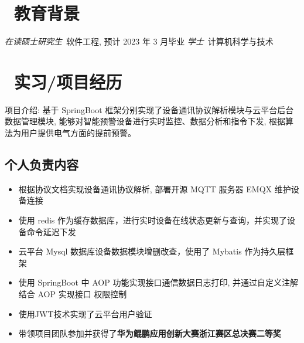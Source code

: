 \documentclass{resume}
\begin{document}


 
\section{\faGraduationCap\  教育背景}
\textit{在读硕士研究生}\ 软件工程, 预计 2023 年 3 月毕业
\textit{学士}\ 计算机科学与技术

\section{\faUsers\ 实习/项目经历}
项目介绍: 基于 SpringBoot 框架分别实现了设备通讯协议解析模块与云平台后台数据管理模块, 能够对智能预警设备进行实时监控、数据分析和指令下发, 根据算法为用户提供电气方面的提前预警。
\subsection{个人负责内容}
\begin{itemize}
  \item 根据协议文档实现设备通讯协议解析, 部署开源 MQTT 服务器 EMQX 维护设备连接
  \item 使用 redis 作为缓存数据库，进行实时设备在线状态更新与查询，并实现了设备命令延迟下发
  \item 云平台 Mysql 数据库设备数据模块增删改查，使用了 Mybatis 作为持久层框架
  \item 使用 SpringBoot 中 AOP 功能实现接口通信数据日志打印, 并通过自定义注解结合 AOP 实现接口
权限控制
  \item 使用JWT技术实现了云平台用户验证
  \item 带领项目团队参加并获得了\textbf{华为鲲鹏应用创新大赛浙江赛区总决赛二等奖}
\end{itemize}

\end{document}
